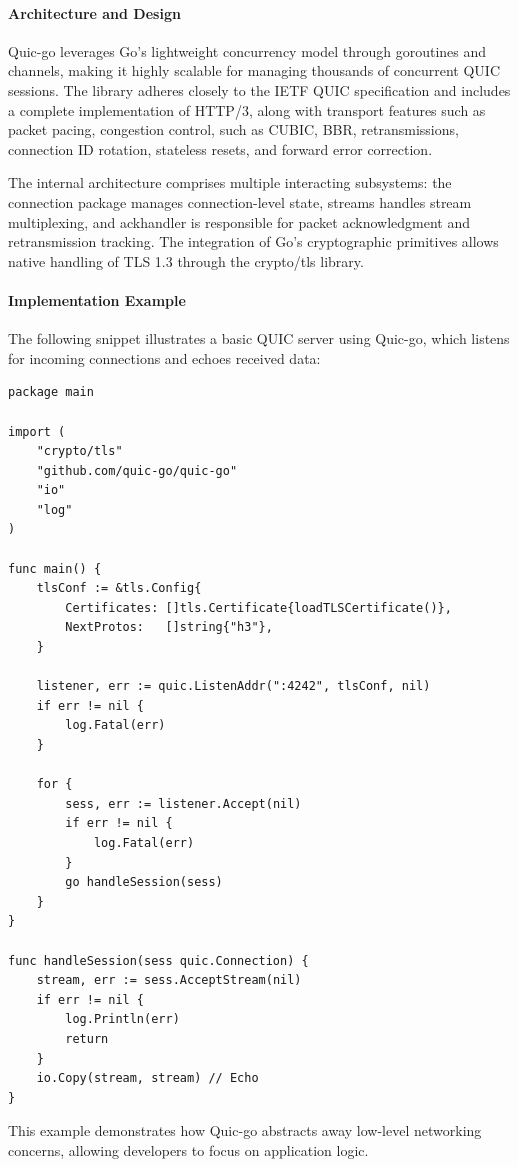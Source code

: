 \paragraph{Architecture and Design}
Quic-go leverages Go's lightweight concurrency model through goroutines and channels, making it highly scalable for managing thousands of concurrent QUIC sessions. The library adheres closely to the IETF QUIC specification and includes a complete implementation of HTTP/3, along with transport features such as packet pacing, congestion control, such as CUBIC, BBR, retransmissions, connection ID rotation, stateless resets, and forward error correction.

The internal architecture comprises multiple interacting subsystems: the connection package manages connection-level state, streams handles stream multiplexing, and ackhandler is responsible for packet acknowledgment and retransmission tracking. The integration of Go's cryptographic primitives allows native handling of TLS 1.3 through the crypto/tls library.

\paragraph{Implementation Example}
The following snippet illustrates a basic QUIC server using Quic-go, which listens for incoming connections and echoes received data:

\begin{lstlisting}[breaklines=true,basicstyle=\small\ttfamily,frame=single]
package main

import (
    "crypto/tls"
    "github.com/quic-go/quic-go"
    "io"
    "log"
)

func main() {
    tlsConf := &tls.Config{
        Certificates: []tls.Certificate{loadTLSCertificate()},
        NextProtos:   []string{"h3"},
    }

    listener, err := quic.ListenAddr(":4242", tlsConf, nil)
    if err != nil {
        log.Fatal(err)
    }

    for {
        sess, err := listener.Accept(nil)
        if err != nil {
            log.Fatal(err)
        }
        go handleSession(sess)
    }
}

func handleSession(sess quic.Connection) {
    stream, err := sess.AcceptStream(nil)
    if err != nil {
        log.Println(err)
        return
    }
    io.Copy(stream, stream) // Echo
}
\end{lstlisting}

This example demonstrates how Quic-go abstracts away low-level networking concerns, allowing developers to focus on application logic.

